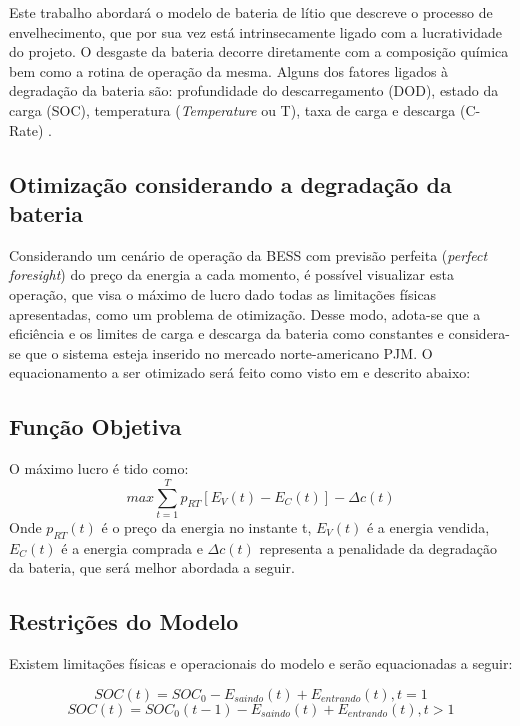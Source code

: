Este trabalho abordará o modelo de bateria de lítio que descreve o processo de envelhecimento, que por sua vez está intrinsecamente ligado com a lucratividade do projeto. O desgaste da bateria decorre diretamente com a composição química bem como a rotina de operação da mesma. Alguns dos fatores ligados à degradação da bateria são: profundidade do descarregamento (\ac{DOD}), estado da carga (\ac{SOC}), temperatura (\textit{Temperature} ou T), taxa de carga e descarga (C-Rate) \cite{Wankmller2017}.

\subsection{Otimização considerando a degradação da bateria}
Considerando um cenário de operação da \ac{BESS} com previsão perfeita (\textit{perfect foresight}) do preço da energia a cada momento, é possível visualizar esta operação, que visa o máximo de lucro dado todas as limitações físicas apresentadas, como um problema de otimização. Desse modo, adota-se que a eficiência e os limites de carga e descarga da bateria como constantes e considera-se que o sistema esteja inserido no mercado norte-americano PJM. O equacionamento a ser otimizado será feito como visto em \cite{Wankmller2017} e descrito abaixo:

\subsection{Função Objetiva}
O máximo lucro é tido como:
\begin{equation}
    \label{eq:funcao_objetiva}
    max \sum_{t=1}^{T}{p}_{RT}[E_{V}(t) - E_{C}(t)] - \Delta{c}(t) 
\end{equation}
Onde $p_{RT}(t)$ é o preço da energia no instante t, $E_{V}(t)$ é a energia vendida, $E_{C}(t)$ é a energia comprada e $\Delta{c}(t)$ representa a penalidade da degradação da bateria, que será melhor abordada a seguir.

\subsection{Restrições do Modelo}
\label{constrains}
Existem limitações físicas e operacionais do modelo e serão equacionadas a seguir:

\begin{equation}
    \label{eq:constrain_1}
    SOC(t) = SOC_0 - E_{saindo}(t) + E_{entrando}(t), t = 1	
\end{equation}
\begin{equation}
    SOC(t) = SOC_{0}(t-1) - E_{saindo}(t) + E_{entrando}(t), t > 1 
\end{equation}

